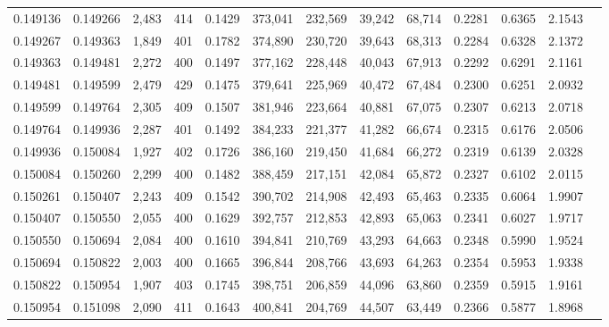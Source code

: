 \begin{tabular}{rrrrrrrrrrrrr}
0.149136 & 0.149266 & 2,483 & 414 &                                     0.1429 & 373,041 & 232,569 &  39,242 &  68,714 & 0.2281 & 0.6365 & 2.1543 \\
0.149267 & 0.149363 & 1,849 & 401 &                                     0.1782 & 374,890 & 230,720 &  39,643 &  68,313 & 0.2284 & 0.6328 & 2.1372 \\
0.149363 & 0.149481 & 2,272 & 400 &                                     0.1497 & 377,162 & 228,448 &  40,043 &  67,913 & 0.2292 & 0.6291 & 2.1161 \\
0.149481 & 0.149599 & 2,479 & 429 &                                     0.1475 & 379,641 & 225,969 &  40,472 &  67,484 & 0.2300 & 0.6251 & 2.0932 \\
0.149599 & 0.149764 & 2,305 & 409 &                                     0.1507 & 381,946 & 223,664 &  40,881 &  67,075 & 0.2307 & 0.6213 & 2.0718 \\
0.149764 & 0.149936 & 2,287 & 401 &                                     0.1492 & 384,233 & 221,377 &  41,282 &  66,674 & 0.2315 & 0.6176 & 2.0506 \\
0.149936 & 0.150084 & 1,927 & 402 &                                     0.1726 & 386,160 & 219,450 &  41,684 &  66,272 & 0.2319 & 0.6139 & 2.0328 \\
0.150084 & 0.150260 & 2,299 & 400 &                                     0.1482 & 388,459 & 217,151 &  42,084 &  65,872 & 0.2327 & 0.6102 & 2.0115 \\
0.150261 & 0.150407 & 2,243 & 409 &                                     0.1542 & 390,702 & 214,908 &  42,493 &  65,463 & 0.2335 & 0.6064 & 1.9907 \\
0.150407 & 0.150550 & 2,055 & 400 &                                     0.1629 & 392,757 & 212,853 &  42,893 &  65,063 & 0.2341 & 0.6027 & 1.9717 \\
0.150550 & 0.150694 & 2,084 & 400 &                                     0.1610 & 394,841 & 210,769 &  43,293 &  64,663 & 0.2348 & 0.5990 & 1.9524 \\
0.150694 & 0.150822 & 2,003 & 400 &                                     0.1665 & 396,844 & 208,766 &  43,693 &  64,263 & 0.2354 & 0.5953 & 1.9338 \\
0.150822 & 0.150954 & 1,907 & 403 &                                     0.1745 & 398,751 & 206,859 &  44,096 &  63,860 & 0.2359 & 0.5915 & 1.9161 \\
0.150954 & 0.151098 & 2,090 & 411 &                                     0.1643 & 400,841 & 204,769 &  44,507 &  63,449 & 0.2366 & 0.5877 & 1.8968 \\

\end{tabular}
